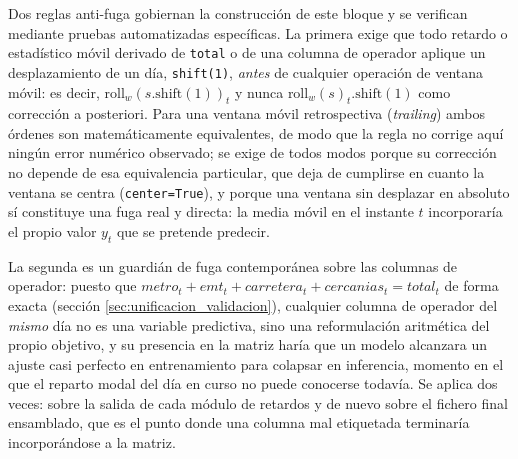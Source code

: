 \begin{table}[htbp]
  \centering
  \small
  
  \caption{}
  \label{tab:grupos_features}
\end{table}

Dos reglas anti-fuga gobiernan la construcción de este bloque y se verifican mediante
pruebas automatizadas específicas. La primera exige que todo retardo o estadístico móvil
derivado de \texttt{total} o de una columna de operador aplique un desplazamiento de un
día, \texttt{shift(1)}, \emph{antes} de cualquier operación de ventana móvil: es decir,
$\text{roll}_w(s.\text{shift}(1))_t$ y nunca $\text{roll}_w(s)_t.\text{shift}(1)$ como
corrección a posteriori. Para una ventana móvil retrospectiva (\emph{trailing}) ambos
órdenes son matemáticamente equivalentes, de modo que la regla no corrige aquí ningún
error numérico observado; se exige de todos modos porque su corrección no depende de esa
equivalencia particular, que deja de cumplirse en cuanto la ventana se centra
(\texttt{center=True}), y porque una ventana sin desplazar en absoluto sí constituye una
fuga real y directa: la media móvil en el instante $t$ incorporaría el propio valor $y_t$
que se pretende predecir.

La segunda es un guardián de fuga contemporánea sobre las columnas de operador: puesto que
$\mathit{metro}_t + \mathit{emt}_t + \mathit{carretera}_t + \mathit{cercanias}_t =
\mathit{total}_t$ de forma exacta (sección \ref{sec:unificacion_validacion}), cualquier
columna de operador del \emph{mismo} día no es una variable predictiva, sino una
reformulación aritmética del propio objetivo, y su presencia en la matriz haría que un
modelo alcanzara un ajuste casi perfecto en entrenamiento para colapsar en inferencia,
momento en el que el reparto modal del día en curso no puede conocerse todavía. Se aplica
dos veces: sobre la salida de cada módulo de retardos y de nuevo sobre el fichero final
ensamblado, que es el punto donde una columna mal etiquetada terminaría incorporándose a
la matriz.

